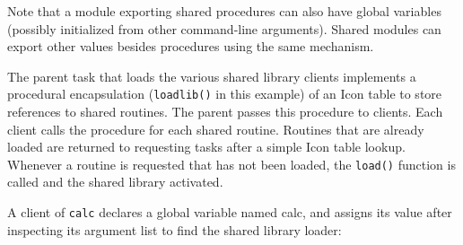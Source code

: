 
Note that a module exporting shared procedures can also have global
variables (possibly initialized from other command-line arguments).
Shared modules can export other values besides procedures using the
same mechanism.

The parent task that loads the various shared library clients implements
a procedural encapsulation ({\texttt{loadlib()}} in
this example) of an Icon table to store references to shared routines.
The parent passes this procedure to clients. Each client calls the
procedure for each shared routine. Routines that are already loaded are
returned to requesting tasks after a simple Icon table lookup. Whenever
a routine is requested that has not been loaded, the
{\texttt{load()}} function is called and the shared
library activated. 


A client of {\texttt{calc}} declares a global variable named {\textrm{calc}},
and assigns its value after inspecting its argument list to find the shared
library loader:


